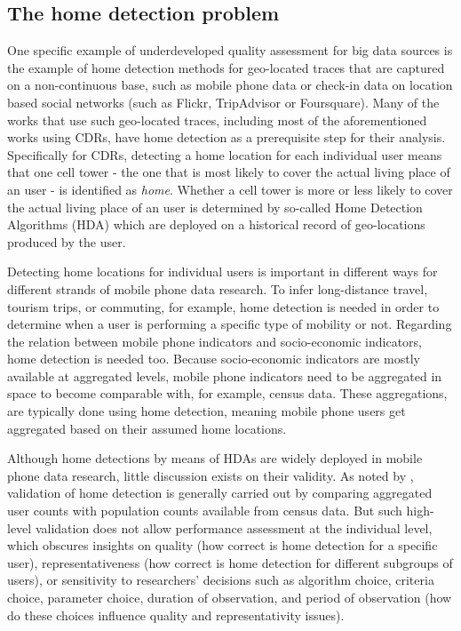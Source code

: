 \documentclass[a4paper]{article}
\begin{document}
\subsection{The home detection problem}

One specific example of underdeveloped quality assessment for big data sources is the example of home detection methods for geo-located traces that are captured on a non-continuous base, such as mobile phone data or check-in data on location based social networks (such as Flickr, TripAdvisor or Foursquare). Many of the works that use such geo-located traces, including most of the aforementioned works using CDRs, have home detection as a prerequisite step for their analysis. Specifically for CDRs, detecting a home location for each individual user means that one cell tower - the one that is most likely to cover the actual living place of an user - is identified as \textit{home}. Whether a cell tower is more or less likely to cover the actual living place of an user is determined by so-called Home Detection Algorithms (HDA) which are deployed on a historical record of geo-locations produced by the user. 

Detecting home locations for individual users is important in different ways for different strands of mobile phone data research. To infer long-distance travel, tourism trips, or commuting, for example, home detection is needed in order to determine when a user is performing a specific type of mobility or not. Regarding the relation between mobile phone indicators and socio-economic indicators, home detection is needed too. Because socio-economic indicators are mostly available at aggregated levels, mobile phone indicators need to be aggregated in space to become comparable with, for example, census data. These aggregations, are typically done using home detection, meaning mobile phone users get aggregated based on their assumed home locations. 

Although home detections by means of HDAs are widely deployed in mobile phone data research, little discussion exists on their validity. As noted by \cite{Vanhoof_JOS}, validation of home detection is generally carried out by comparing aggregated user counts with population counts available from census data. But such high-level validation does not allow performance assessment at the individual level, which obscures insights on quality (how correct is home detection for a specific user), representativeness (how correct is home detection for different subgroups of users), or sensitivity to researchers’ decisions such as algorithm choice, criteria choice, parameter choice, duration of observation, and period of observation (how do these choices influence quality and representativity issues). 
\end{document}

